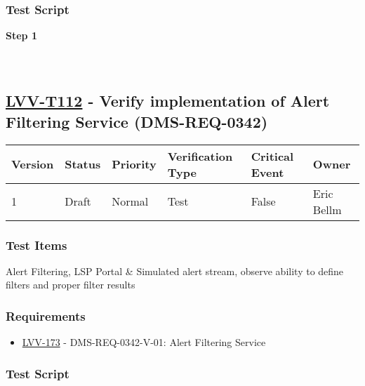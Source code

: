\hypertarget{test-script-11}{%
\subsubsection{Test Script}\label{test-script-11}}

\textbf{Step 1}\\
~\\
~\\

\hypertarget{lvv-t112---verify-implementation-of-alert-filtering-service-dms-req-0342}{%
\subsection{\texorpdfstring{\href{https://jira.lsstcorp.org/secure/Tests.jspa\#/testCase/LVV-T112}{LVV-T112}
- Verify implementation of Alert Filtering Service
(DMS-REQ-0342)}{LVV-T112 - Verify implementation of Alert Filtering Service (DMS-REQ-0342)}}\label{lvv-t112---verify-implementation-of-alert-filtering-service-dms-req-0342}}

\begin{longtable}[]{@{}llllll@{}}
\toprule
Version & Status & Priority & Verification Type & Critical Event &
Owner\tabularnewline
\midrule
\endhead
1 & Draft & Normal & Test & False & Eric Bellm\tabularnewline
\bottomrule
\end{longtable}

\hypertarget{test-items-12}{%
\subsubsection{Test Items}\label{test-items-12}}

Alert Filtering, LSP Portal \& Simulated alert stream, observe ability
to define filters and proper filter results

\hypertarget{requirements-12}{%
\subsubsection{Requirements}\label{requirements-12}}

\begin{itemize}
\tightlist
\item
  \href{https://jira.lsstcorp.org/browse/LVV-173}{LVV-173} -
  DMS-REQ-0342-V-01: Alert Filtering Service
\end{itemize}

\hypertarget{test-script-12}{%
\subsubsection{Test Script}\label{test-script-12}}

